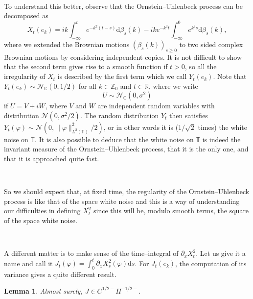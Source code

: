 \documentclass[a4paper,11pt]{article}
\newcommand{\mathd}{\mathrm{d}}
\newtheorem{lemma}{Lemma}
{\theorembodyfont{\rmfamily}\newtheorem{remark}{Remark}}
\begin{document}
\

To understand this better, observe that the Ornstein--Uhlenbeck process can
be decomposed as
\[ X_t (e_k) = ik \int_{- \infty}^t e^{- k^2 (t - s)} \mathd \beta_s (k) - ik
   e^{- k^2 t} \int_{- \infty}^0 e^{k^2 s} \mathd \beta_s (k), \]
where we extended the Brownian motions $(\beta_s (k))_{s \geqslant 0}$ to two
sided complex Brownian motions by considering independent copies. It is not
difficult to show that the second term gives rise to a smooth function if $t >
0$, so all the irregularity of $X_t$ is described by the first term which we
call $Y_t (e_k)$. Note that $Y_t (e_k) \sim \mathcal{N}_{\mathbb{C}} (0, 1 /
2)$ for all $k \in \mathbb{Z}_0$ and $t \in \mathbb{R}$, where we write
\[ U \sim \mathcal{N}_{\mathbb{C}} (0, \sigma^2) \]
if $U = V + i W$, where $V$ and $W$ are independent random variables with
distribution $\mathcal{N} (0, \sigma^2 / 2)$. The random distribution $Y_t$
then satisfies $Y_t (\varphi) \sim \mathcal{N} (0, \| \varphi \|_{L^2
(\mathbb{T})}^2 / 2)$, or in other words it is ($1 / \sqrt{2}$ times) the
white noise on $\mathbb{T}$. It is also possible to deduce that the white
noise on $\mathbb{T}$ is indeed the invariant measure of the
Ornstein--Uhlenbeck process, that it is the only one, and that it is
approached quite fast.

\

So we should expect that, at fixed time, the regularity of the
Ornstein--Uhlenbeck process is like that of the space white noise and this is
a way of understanding our difficulties in defining $X^2_t$ since this will
be, modulo smooth terms, the square of the space white noise.

\

A different matter is to make sense of the time--integral of $\partial_x
X^2_t$. Let us give it a name and call it $J_t (\varphi) = \int_0^t \partial_x
X_s^2 (\varphi) \mathd s$. For $J_t (e_k)$, the computation of its variance
gives a quite different result.

\begin{lemma}
  \label{lem:OU square}Almost surely, $J \in C^{1 / 2 -} H^{- 1 / 2 -}$.
\end{lemma}
\end{document}
